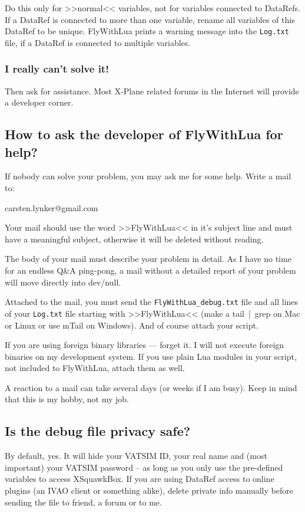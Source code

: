 \documentclass[11pt,parskip=half,a4paper]{scrartcl}
\begin{document}
Do this only for >>normal<< variables, not for variables connected to DataRefs. If a DataRef is connected to more than one variable, rename all variables of this DataRef to be unique. FlyWithLua prints a warning message into the \verb|Log.txt| file, if a DataRef is connected to multiple variables.

\subsubsection{I really can't solve it!}

Then ask for assistance. Most X-Plane related forums in the Internet will provide a developer corner.

\subsection{How to ask the developer of FlyWithLua for help?}

If nobody can solve your problem, you may ask me for some help. Write a mail to:

carsten.lynker@gmail.com

Your mail should use the word >>FlyWithLua<< in it's subject line and must have a meaningful subject, otherwise it will be deleted without reading.

The body of your mail must describe your problem in detail. As I have no time for an endless Q\&A ping-pong, a mail without a detailed report of your problem will move directly into dev/null.

Attached to the mail, you must send the \verb|FlyWithLua_debug.txt| file and all lines of your \verb|Log.txt| file starting with >>FlyWithLua<< (make a tail~|~grep on Mac or Linux or use mTail on Windows). And of course attach your script.

If you are using foreign binary libraries --- forget it. I will not execute foreign binaries on my development system. If you use plain Lua modules in your script, not included to FlyWithLua, attach them as well.

A reaction to a mail can take several days (or weeks if I am busy). Keep in mind that this is my hobby, not my job.

\subsection{Is the debug file privacy safe?}

By default, yes. It will hide your VATSIM ID, your real name and (most important) your VATSIM password -- as long as you only use the pre-defined variables to access XSquawkBox. If you are using DataRef access to online plugins (an IVAO client or something alike), delete private info manually before sending the file to friend, a forum or to me.
\end{document}
